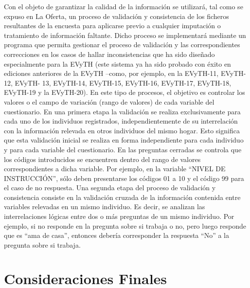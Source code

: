 \documentclass[
  openany]{book}
\begin{document}
Con el objeto de garantizar la calidad de la información se utilizará, tal como se expuso en La Oferta, un proceso de validación y consistencia de los ficheros resultantes de la encuesta para aplicarse previo a cualquier imputación o tratamiento de información faltante. Dicho proceso se implementará mediante un programa que permita gestionar el proceso de validación y las correspondientes correcciones en los casos de hallar inconsistencias que ha sido diseñado especialmente para la EVyTH (este sistema ya ha sido probado con éxito en ediciones anteriores de la EVyTH --como, por ejemplo, en la EVyTH-11, EVyTH-12, EVyTH- 13, EVyTH-14, EVyTH-15, EVyTH-16, EVyTH-17, EVyTH-18, EVyTH-19 y la EVyTH-20).
En este tipo de procesos, el objetivo es controlar los valores o el campo de variación (rango de valores) de cada variable del cuestionario. En una primera etapa la validación se realiza exclusivamente para cada uno de los individuos registrados, independientemente de su interrelación con la información relevada en otros individuos del mismo hogar. Esto significa que esta validación inicial se realiza en forma independiente para cada individuo y para cada variable del cuestionario.
En las preguntas cerradas se controla que los códigos introducidos se encuentren dentro del rango de valores correspondientes a dicha variable. Por ejemplo, en la variable ``NIVEL DE INSTRUCCIÓN'', sólo deben presentarse los códigos 01 a 10 y el código 99 para el caso de no respuesta.
Una segunda etapa del proceso de validación y consistencia consiste en la validación cruzada de la información contenida entre variables relevadas en un mismo individuo. Es decir, se analizan las interrelaciones lógicas entre dos o más preguntas de un mismo individuo. Por ejemplo, si no responde en la pregunta sobre si trabaja o no, pero luego responde que es ``ama de casa'', entonces debería corresponder la respuesta ``No'' a la pregunta sobre si trabaja.

\hypertarget{consideraciones-finales}{%
\chapter*{Consideraciones Finales}\label{consideraciones-finales}}

  
\end{document}
